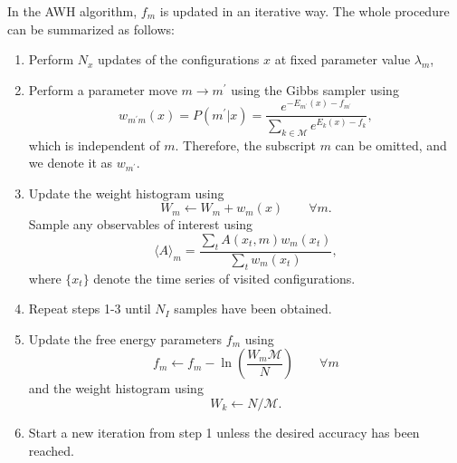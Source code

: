 In the AWH algorithm, $f_m$ is updated in an iterative way. The whole procedure can be summarized as follows:
\begin{enumerate}[label=(\arabic*)]
	\item Perform $N_x$ updates of the configurations $x$ at fixed parameter value $\lambda_m$,
	\item Perform a parameter move $m \to m^\prime$ using the Gibbs sampler using
	\begin{equation}
		w_{m^\prime m}(x)=P(m^\prime|x)=\frac{e^{-E_{m^\prime}(x)-f_{m^\prime}}}{\sum\limits_{k\in \mathcal{M}}e^{E_k(x)-f_k}},
	\end{equation}
    which is independent of $m$. Therefore, the subscript $m$ can be omitted, and we denote it as $w_{m^\prime}$. 
    \item Update the weight histogram using
    \begin{equation}
        W_m\leftarrow W_m+w_{m}(x)\qquad \forall m. 
    \end{equation}
    Sample any observables of interest using
    \begin{equation}
    	\langle A\rangle_m=\frac{\sum_t A(x_t,m)w_{m}(x_t)}{\sum_t w_{m}(x_t)},
    \end{equation}
    where $\{x_t\}$ denote the time series of visited configurations.
    \item Repeat steps 1-3 until $N_I$ samples have been obtained.
    \item Update the free energy parameters $f_m$ using
    \begin{equation}
    	f_m\leftarrow f_m-\ln\left(\frac{W_m\mathcal{M}}{N}\right) \qquad \forall m
    \end{equation}
    and the weight histogram using
    \begin{equation}
    	W_k\leftarrow N/\mathcal{M}.
    \end{equation}
    \item Start a new iteration from step 1 unless the desired accuracy has been reached.
\end{enumerate}
